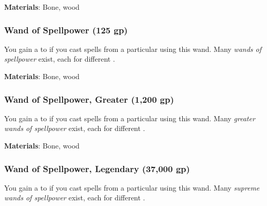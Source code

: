 \vspace{0.25em}
\textbf{Materials}: Bone, wood


\lowercase{\hypertarget{item:Wand of Spellpower}{}}\label{item:Wand of Spellpower}
\hypertarget{item:Wand of Spellpower}{\subsubsection{Wand of Spellpower\hfill{} (125 gp)}}

You gain a   to  if you cast spells from a particular  using this wand.
Many \textit{wands of spellpower} exist, each for different .



\vspace{0.25em}
\textbf{Materials}: Bone, wood


\lowercase{\hypertarget{item:Wand of Spellpower, Greater}{}}\label{item:Wand of Spellpower, Greater}
\hypertarget{item:Wand of Spellpower, Greater}{\subsubsection{Wand of Spellpower, Greater\hfill{} (1,200 gp)}}

You gain a   to  if you cast spells from a particular  using this wand.
Many \textit{greater wands of spellpower} exist, each for different .



\vspace{0.25em}
\textbf{Materials}: Bone, wood


\lowercase{\hypertarget{item:Wand of Spellpower, Legendary}{}}\label{item:Wand of Spellpower, Legendary}
\hypertarget{item:Wand of Spellpower, Legendary}{\subsubsection{Wand of Spellpower, Legendary\hfill{} (37,000 gp)}}

You gain a   to  if you cast spells from a particular  using this wand.
Many \textit{supreme wands of spellpower} exist, each for different .



